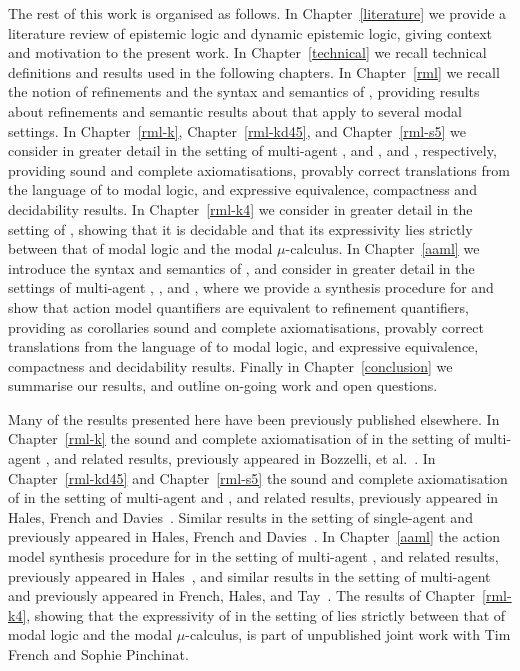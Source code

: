 The rest of this work is organised as follows.
In Chapter~\ref{literature} we provide a literature review of epistemic logic and dynamic epistemic logic, giving context and motivation to the present work.
In Chapter~\ref{technical} we recall technical definitions and results used in the following chapters.
In Chapter~\ref{rml} we recall the notion of refinements and the syntax and semantics of \logicRml{}, providing results about refinements and semantic results about \logicRml{} that apply to several modal settings.
In Chapter~\ref{rml-k}, Chapter~\ref{rml-kd45}, and Chapter~\ref{rml-s5} we consider in greater detail \logicRml{} in the setting of multi-agent \classK{}, \classKFF{} and \classKD{}, and \classS{}, respectively, providing sound and complete axiomatisations, provably correct translations from the language of \logicRml{} to modal logic, and expressive equivalence, compactness and decidability results.
In Chapter~\ref{rml-k4} we consider in greater detail \logicRml{} in the setting of \classKF{}, showing that it is decidable and that its expressivity lies strictly between that of modal logic and the modal $\mu$-calculus.
In Chapter~\ref{aaml} we introduce the syntax and semantics of \logicAaml{}, and consider in greater detail \logicAaml{} in the settings of multi-agent \classK{}, \classKFF{}, and \classS{}, where we provide a synthesis procedure for \logicAaml{} and show that action model quantifiers are equivalent to refinement quantifiers, providing as corollaries sound and complete axiomatisations, provably correct translations from the language of \logicAaml{} to modal logic, and expressive equivalence, compactness and decidability results.
Finally in Chapter~\ref{conclusion} we summarise our results, and outline on-going work and open questions.

Many of the results presented here have been previously published elsewhere.
In Chapter~\ref{rml-k} the sound and complete axiomatisation of \logicRml{} in the setting of multi-agent \classK{}, and related results, previously appeared in Bozzelli, et al.~\cite{bozzelli:2014b}.
In Chapter~\ref{rml-kd45} and Chapter~\ref{rml-s5} the sound and complete axiomatisation of \logicRml{} in the setting of multi-agent \classKD{} and \classS{}, and related results, previously appeared in Hales, French and Davies~\cite{hales:2012}.
Similar results in the setting of single-agent \classKD{} and \classS{} previously appeared in Hales, French and Davies~\cite{hales:2011a}.
In Chapter~\ref{aaml} the action model synthesis procedure for \logicAaml{} in the setting of multi-agent \classK{}, and related results, previously appeared in Hales~\cite{hales:2013}, and similar results in the setting of multi-agent \classKFF{} and \classS{} previously appeared in French, Hales, and Tay~\cite{hales:2014}.
The results of Chapter~\ref{rml-k4}, showing that the expressivity of \logicRml{} in the setting of \classKF{} lies strictly between that of modal logic and the modal $\mu$-calculus, is part of unpublished joint work with Tim French and Sophie Pinchinat.
